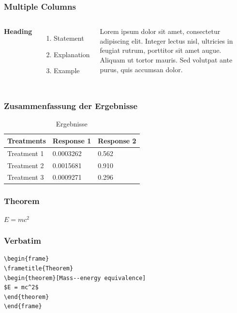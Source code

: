 \documentclass{beamer}
\begin{document}
\begin{frame}
\frametitle{Multiple Columns}
\begin{columns}[c] %

\textbf{Heading}
\begin{enumerate}
\item Statement
\item Explanation
\item Example
\end{enumerate}

Lorem ipsum dolor sit amet, consectetur adipiscing elit. Integer lectus nisl, ultricies in feugiat rutrum, porttitor sit amet augue. Aliquam ut tortor mauris. Sed volutpat ante purus, quis accumsan dolor.

\end{columns}
\end{frame}


\begin{frame}
\frametitle{Zusammenfassung der Ergebnisse}
\begin{table}
\begin{tabular}{l l l}
\toprule
\textbf{Treatments} & \textbf{Response 1} & \textbf{Response 2}\\
\midrule
Treatment 1 & 0.0003262 & 0.562 \\
Treatment 2 & 0.0015681 & 0.910 \\
Treatment 3 & 0.0009271 & 0.296 \\
\bottomrule
\end{tabular}
\caption{Ergebnisse}
\end{table}
\end{frame}


\begin{frame}
\frametitle{Theorem}
\begin{theorem}
$E = mc^2$
\end{theorem}
\end{frame}


\begin{frame}[fragile] %
\frametitle{Verbatim}
\begin{example}
\begin{verbatim}
\begin{frame}
\frametitle{Theorem}
\begin{theorem}[Mass--energy equivalence]
$E = mc^2$
\end{theorem}
\end{frame}\end{verbatim}
\end{example}
\end{frame}
\end{document}
